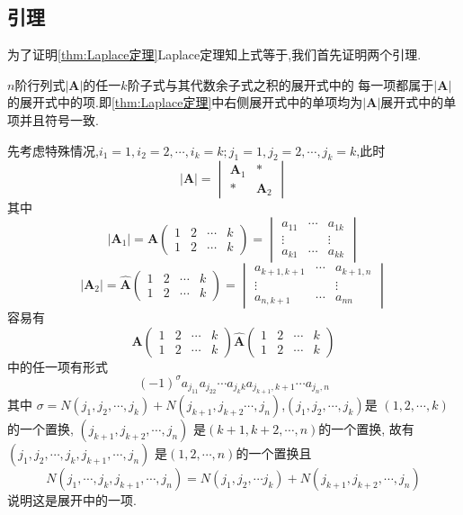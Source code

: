 \subsection{引理}
为了证明\cref{thm:Laplace定理}\textup{Laplace}定理知上式等于,我们首先证明两个引理.
\begin{green}
\begin{lemma}[单项保持]\label{lem:单项保持}
$n$阶行列式$\left|\bm{A}\right|$的任一$k$阶子式与其代数余子式之积的展开式中的
每一项都属于$\left|\bm{A}\right|$的展开式中的项.即\cref{thm:Laplace定理}中右侧展开式中的单项均为$\left|\bm{A}\right|$展开式中的单项并且符号一致.
\end{lemma}
\begin{Proof}
先考虑特殊情况,$i_1=1,i_2=2,\cdots,
i_k=k;j_1=1,j_2=2,\cdots,j_k=k$,此时
\[
\left|\bm{A}\right|
=
\begin{vmatrix}
    \bm{A}_1 & *\\
    *&\bm{A}_2
\end{vmatrix}
\]
其中
\[
\left|\bm{A}_1\right|
=
\bm{A}\begin{pmatrix}
    1 & 2 &\cdots &k\\
    1 & 2&\cdots&k
\end{pmatrix}
=\begin{vmatrix}
    a_{11} & \cdots &a_{1k}\\
    \vdots &&\vdots\\
    a_{k1}&\cdots&a_{kk}
\end{vmatrix}
\]
\[
\left|\bm{A}_2\right|
=
\widehat{\bm{A}}
\begin{pmatrix}
    1 & 2 &\cdots &k\\
    1 & 2&\cdots&k
\end{pmatrix}
=\begin{vmatrix}
    a_{k+1,k+1} & \cdots &a_{k+1,n}\\
    \vdots &&\vdots\\
    a_{n,k+1}&\cdots&a_{nn}
\end{vmatrix}
\]
容易有\[
\bm{A}\begin{pmatrix}
    1 & 2 &\cdots &k\\
    1 & 2&\cdots&k
\end{pmatrix}
\widehat{\bm{A}}
\begin{pmatrix}
    1 & 2 &\cdots &k\\
    1 & 2&\cdots&k
\end{pmatrix}
\]
中的任一项有形式
\[
\left(-1\right)^{\sigma}
a_{j_11}a_{j_22}\cdots
a_{j_kk}a_{j_{k+1},k+1}\cdots
a_{j_n,n}
\]
其中
$\sigma = 
N\left(
    j_1,j_2,\cdots,j_k
\right)+N\left(
    j_{k+1},j_{k+2}\cdots,j_n
\right)$,$\left(j_1,j_2,\cdots,j_k\right)$是
$\left(1,2,\cdots,k\right)$的一个置换,
$\left(j_{k + 1},j_{k+2},\cdots,j_n\right)$
是$\left(k+1,k+2,\cdots,n\right)$的一个置换,
故有$\left(
    j_1,j_2,\cdots,j_k,j_{k+1},\cdots,j_n
\right)$
是$\left(1,2,\cdots,n\right)$的一个置换且
\[
N\left(j_1,\cdots,j_k,j_{k+1},\cdots,j_n\right)
=N\left(j_1,j_2,\cdots j_k\right)+
N\left(j_{k+1},j_{k+2},\cdots,j_n\right)
\]
说明这是展开中的一项.


\end{Proof}
\end{green}
